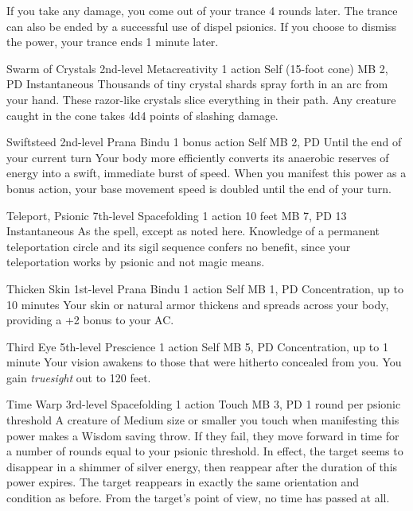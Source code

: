 If you take any damage,
you come out of your trance 4 rounds later.
The trance can also be ended by a
successful use of dispel psionics.
If you choose to dismiss the power,
your trance ends 1 minute later.

\DndPowerHeader%
  {Swarm of Crystals}
  {2nd-level Metacreativity}
  {1 action}
  {Self (15-foot cone)}
  {MB 2, PD \lvltwo}
  {Instantaneous}
Thousands of tiny crystal shards spray forth in an arc from your hand.
These razor-like crystals slice everything in their path.
Any creature caught in the cone takes 4d4 points of slashing damage.

\DndPowerHeader%
  {Swiftsteed}
  {2nd-level Prana Bindu}
  {1 bonus action}
  {Self}
  {MB 2, PD \lvltwo}
  {Until the end of your current turn}
Your body more efficiently converts its anaerobic
reserves of energy into a swift, immediate burst of speed.
When you manifest this power as a bonus action,
your base movement speed is doubled until the end
of your turn.

  \DndPowerHeader%
    {Teleport, Psionic}
    {7th-level Spacefolding}
    {1 action}
    {10 feet}
    {MB 7, PD 13}
    {Instantaneous}
  As the  spell, except as noted here.
  Knowledge of a permanent teleportation circle and
  its sigil sequence confers no benefit,
  since your teleportation works by psionic 
  and not magic means.

\DndPowerHeader%
  {Thicken Skin}
  {1st-level Prana Bindu}
  {1 action}
  {Self}
  {MB 1, PD \lvlone}
  {Concentration, up to 10 minutes}
Your skin or natural armor thickens
and spreads across your body,
providing a +2 bonus to your AC.

\DndPowerHeader%
  {Third Eye}
  {5th-level Prescience}
  {1 action}
  {Self}
  {MB 5, PD \lvlfive}
  {Concentration, up to 1 minute}
Your vision awakens to those that were hitherto
concealed from you.
You gain \emph{truesight} out to 120 feet.

\DndPowerHeader%
  {Time Warp}
  {3rd-level Spacefolding}
  {1 action}
  {Touch}
  {MB 3, PD \lvlthree}
  {1 round per psionic threshold}
A creature of Medium size or smaller
you touch when manifesting this power makes a Wisdom saving throw.
If they fail, they move forward in time for a number of rounds
equal to your psionic threshold.
In effect, the target seems to disappear in a shimmer
of silver energy,
then reappear after the duration of this power expires.
The target reappears in exactly the same
orientation and condition as before.
From the target's point of view,
no time has passed at all.

